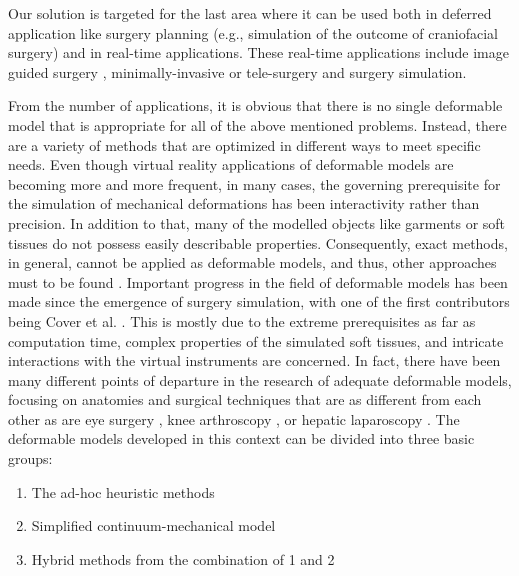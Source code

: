 Our solution is targeted for the last area where it can be used both in deferred application like surgery planning (e.g., simulation of the 
outcome of craniofacial surgery) \cite{bro1995modelling, keeve1996craniofacial} and in real-time applications. These real-time applications 
include image guided surgery \cite{Szekely2000}, minimally-invasive or tele-surgery and surgery simulation. 

From the number of applications, it is obvious that there is no single deformable model that is appropriate for all of the above mentioned 
problems. Instead, there are a variety of methods that are optimized in different ways to meet specific needs. Even though virtual reality 
applications of deformable models are becoming more and more frequent, in many cases, the governing prerequisite for the simulation of 
mechanical deformations has been interactivity rather than precision. In addition to that, many of the modelled objects like garments or soft 
tissues do not possess easily describable properties. Consequently, exact methods, in general, cannot be applied as deformable models, and thus, 
other approaches must to be found \cite{bro1998finite}. Important progress in the field of deformable models has been made since the emergence of surgery 
simulation, with one of the first contributors being Cover et al. \cite{cover1993interactively}. This is mostly due to the extreme prerequisites 
as far as computation time, complex properties of the simulated soft tissues, and intricate interactions with the virtual instruments are concerned. 
In fact, there have been many different points of departure in the research of adequate deformable models, focusing on anatomies and surgical techniques 
that are as different from each other as are eye surgery \cite{cai2001parametric, sagar1994virtual}, knee arthroscopy \cite{gibson1997simulating, 
hoffman1998commercially}, or hepatic laparoscopy \cite{cotin1999real}. The deformable models developed in this context can be divided into three basic groups: 

\begin{enumerate}
 \item The ad-hoc heuristic methods
 \item Simplified continuum-mechanical model
 \item Hybrid methods from the combination of 1 and 2
\end{enumerate}

